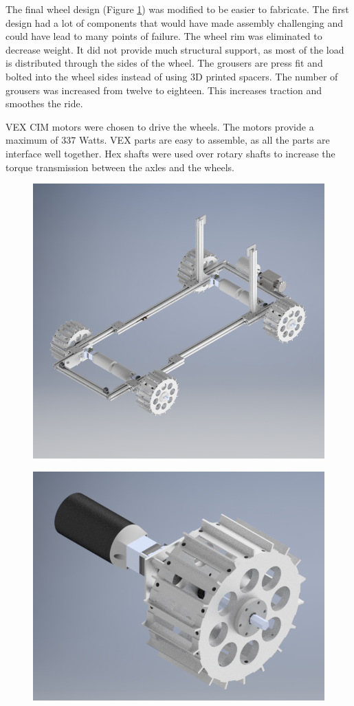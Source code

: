 \documentclass[class=article, crop=false]{standalone}
\begin{document}
	The final wheel design (Figure \ref{fig:wheel-cad}) was modified to be easier to fabricate. The first design had a lot of components that would have made assembly challenging and could have lead to many points of failure. The wheel rim was eliminated to decrease weight. It did not provide much structural support, as most of the load is distributed through the sides of the wheel. The grousers are press fit and bolted into the wheel sides instead of using 3D printed spacers. The number of grousers was increased from twelve to eighteen. This increases traction and smoothes the ride. 

	VEX CIM motors were chosen to drive the wheels. The motors provide a maximum of 337 Watts. VEX parts are easy to assemble, as all the parts are interface well together. Hex shafts were used over rotary shafts to increase the torque transmission between the axles and the wheels.
	
	
	\begin{figure}
	\centering
	\begin{minipage}{.5\textwidth}
	  \centering
	  \includegraphics[width=.4\linewidth]{09_Figures/frame-cad.jpg}
	  \label{fig:frame-cad}
	\end{minipage}
	\begin{minipage}{.5\textwidth}
	  \centering
	  \includegraphics[width=.4\linewidth]{09_Figures/wheel-cad.jpg}
	  \label{fig:wheel-cad}
	\end{minipage}
	\end{figure}
	
\end{document}
